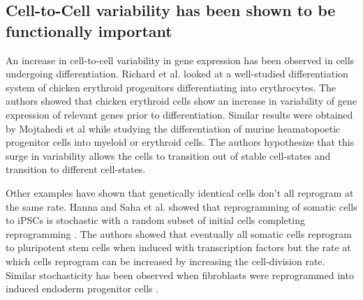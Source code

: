 \subsection{Cell-to-Cell variability has been shown to be functionally important}

An increase in cell-to-cell variability in gene expression has been observed in cells undergoing differentiation. Richard et al.  \cite{richard_single-cell-based_2016} looked at a well-studied differentiation system of chicken erythroid progenitors differentiating into erythrocytes. The authors showed that chicken erythroid cells show an increase in variability of gene expression of relevant genes prior to differentiation. Similar results were obtained by Mojtahedi et al  \cite{mojtahedi_cell_2016} while studying the differentiation of murine heamatopoetic progenitor cells into myeloid or erythroid cells. The authors hypothesize that this surge in variability allows the cells to transition out of stable cell-states and transition to different cell-states. 


Other examples have shown that genetically identical cells don't all reprogram at the same rate. Hanna and Saha et al. showed that reprogramming of somatic cells to iPSCs is stochastic with a random subset of initial cells completing reprogramming  \cite{hanna_direct_2009}. The authors showed that eventually all somatic cells reprogram to pluripotent stem cells when induced with transcription factors but the rate at which cells reprogram can be increased by increasing the cell-division rate. Similar stochasticity has been observed when fibroblasts were reprogrammed into induced endoderm progenitor cells \cite{biddy_single-cell_2018}.

